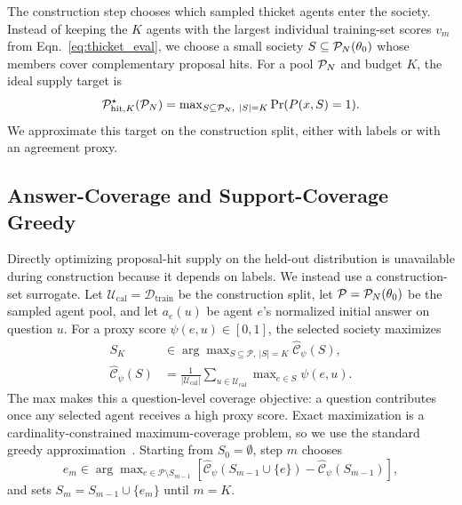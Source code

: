 \documentclass{article}
\newcommand{\eqnref}[1]{Eqn.~\eqref{#1}}
\begin{document}
The construction step chooses which sampled thicket agents enter the society.
Instead of keeping the $K$ agents with the largest individual training-set
scores $v_m$ from \eqnref{eq:thicket_eval}, we choose a small society
$S\subseteq{\mathcal{P}}_N(\theta_0)$ whose members cover complementary proposal hits.
For a pool \({\mathcal{P}}_N\) and budget $K$, the ideal supply target is
\begin{equation}
    \mathcal P_{\mathrm{hit},K}^\star({\mathcal{P}}_N)
    =
    \max\nolimits_{S\subseteq {\mathcal{P}}_N,\ |S|=K}\Pr(P(x,S)=1).
    \label{eq:proposal_hit_potential}
\end{equation}
We approximate this target on the construction split, either with labels or with
an agreement proxy.

\subsection{Answer-Coverage and Support-Coverage Greedy}
\label{subsec:proxy_greedy_covering}

Directly optimizing proposal-hit supply on the held-out distribution is
unavailable during construction because it depends on labels. We instead use a
construction-set surrogate. Let
$\mathcal U_{\mathrm{cal}}=\mathcal D_{\mathrm{train}}$ be the construction
split, let $\mathcal P={\mathcal{P}}_N(\theta_0)$ be the sampled agent pool, and let
$a_e(u)$ be agent $e$'s normalized initial answer on question $u$. For a proxy
score $\psi(e,u)\in[0,1]$, the selected society maximizes
\begin{equation}
\begin{aligned}
    S_K &\in \arg\max\nolimits_{S\subseteq\mathcal P,\ |S|=K}
    \widehat{\mathcal C}_\psi(S),\\
    \widehat{\mathcal C}_\psi(S)
    &=\frac{1}{|\mathcal U_{\mathrm{cal}}|}
    \sum\nolimits_{u\in\mathcal U_{\mathrm{cal}}}\max\nolimits_{e\in S}\psi(e,u).
    \label{eq:coverage_objective}
\end{aligned}
\end{equation}
The max makes this a question-level coverage objective: a question contributes
once any selected agent receives a high proxy score. Exact maximization is a
cardinality-constrained maximum-coverage problem, so we use the standard greedy
approximation~\citep{nemhauser1978analysis}. Starting from
$S_0=\emptyset$, step $m$ chooses
\begin{equation}
    e_m\in\arg\max\nolimits_{e\in\mathcal P\setminus S_{m-1}}
    \left[\widehat{\mathcal C}_\psi(S_{m-1}\cup\{e\})
    -\widehat{\mathcal C}_\psi(S_{m-1})\right],
    \label{eq:greedy_step}
\end{equation}
and sets $S_m=S_{m-1}\cup\{e_m\}$ until $m=K$.
\end{document}
